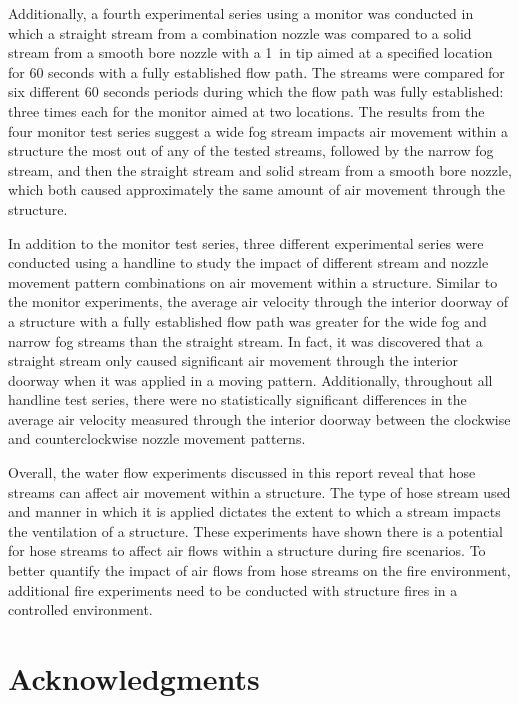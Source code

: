 \documentclass[12pt,oneside]{book}
\begin{document}
Additionally, a fourth experimental series using a monitor was conducted in which a straight stream from a combination nozzle was compared to a solid stream from a smooth bore nozzle with a 1~in tip aimed at a specified location for 60 seconds with a fully established flow path. The streams were compared for six different 60 seconds periods during which the flow path was fully established: three times each for the monitor aimed at two locations. The results from the four monitor test series suggest a wide fog stream impacts air movement within a structure the most out of any of the tested streams, followed by the narrow fog stream, and then the straight stream and solid stream from a smooth bore nozzle, which both caused approximately the same amount of air movement through the structure.

In addition to the monitor test series, three different experimental series were conducted using a handline to study the impact of different stream and nozzle movement pattern combinations on air movement within a structure. Similar to the monitor experiments, the average air velocity through the interior doorway of a structure with a fully established flow path was greater for the wide fog and narrow fog streams than the straight stream. In fact, it was discovered that a straight stream only caused significant air movement through the interior doorway when it was applied in a moving pattern. Additionally, throughout all handline test series, there were no statistically significant differences in the average air velocity measured through the interior doorway between the clockwise and counterclockwise nozzle movement patterns.

Overall, the water flow experiments discussed in this report reveal that hose streams can affect air movement within a structure. The type of hose stream used and manner in which it is applied dictates the extent to which a stream impacts the ventilation of a structure. These experiments have shown there is a potential for hose streams to affect air flows within a structure during fire scenarios. To better quantify the impact of air flows from hose streams on the fire environment, additional fire experiments need to be conducted with structure fires in a controlled environment.

\chapter{Acknowledgments}
\label{chap:acknowledgments}
\end{document}
